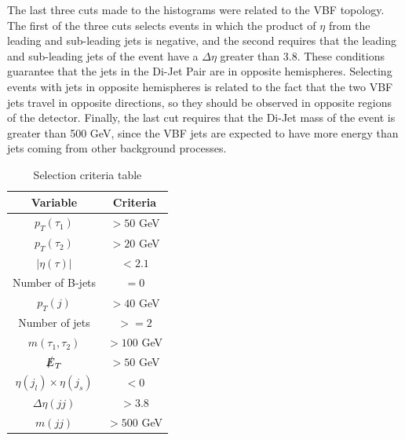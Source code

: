 The last three cuts made to the histograms were related to the VBF topology. The first of the three cuts selects events in which the product of $\eta$ from the leading and sub-leading jets is negative, and the second requires that the leading and sub-leading jets of the event have a $\Delta \eta$ greater than 3.8. These conditions guarantee that the jets in the Di-Jet Pair are in opposite hemispheres. Selecting events with jets in opposite hemispheres is related to the fact that the two VBF jets travel in opposite directions, so they should be observed in opposite regions of the detector. Finally, the last cut requires that the Di-Jet mass of the event is greater than 500 GeV, since the VBF jets are expected to have more energy than jets coming from other background processes.

\begin{table}
\centering
\begin{tabular}{|c|c|}
\hline
Variable & Criteria \\
\hline
$p_{T}(\tau_{1})$ & $> 50$ GeV \\
$p_{T}(\tau_{2})$ & $> 20$ GeV \\
$|\eta(\tau)|$ & $< 2.1$ \\ 
Number of B-jets & $= 0$ \\
$p_{T}(j)$ & $> 40$ GeV \\
Number of jets & $ >= 2$ \\
$m(\tau_{1}, \tau_{2})$ & $> 100$ GeV \\
$\slashed{E}_{T}$ & $> 50$ GeV \\
$\eta(j_{l}) \times \eta(j_{s})$ & $<0$ \\
$\Delta \eta(jj)$ & $ > 3.8$ \\
$m(jj)$ & $> 500$ GeV \\
\hline
\end{tabular}
\caption{Selection criteria table}
\label{table: cuts}
\end{table}
